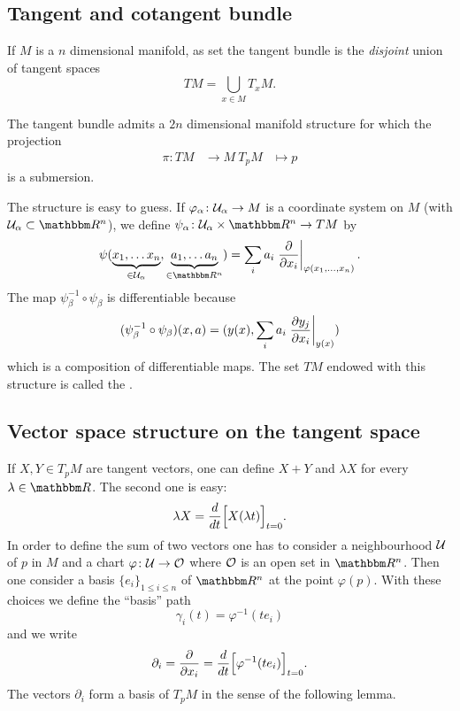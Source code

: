 \subsection{Tangent and cotangent bundle}

If $M$ is a $n$ dimensional manifold, as set the tangent bundle is the \emph{disjoint} union of tangent spaces
\[
  TM=\bigcup_{x\in M}T_xM.
\]

\begin{theorem}
	The tangent bundle admits a $2n$ dimensional manifold structure for which the projection 
	\begin{equation}
		\begin{aligned}
			\pi \colon TM &\to M\
			T_pM&\mapsto p
		\end{aligned}
	\end{equation}	
	is a submersion.
\end{theorem}

The structure is easy to guess. If $\varphi_{\alpha}\colon \mathcal{U}_{\alpha}\to M$ is a coordinate system on $M$ (with $\mU_{\alpha}\subset\eR^n$), we define $\dpt{\psi_{\alpha}}{\mU_{\alpha}\times \eR^n}{TM}$ by
\[
  \psi( \underbrace{x_1,\ldots x_n}_{\in\mU_{\alpha}},\underbrace{a_1,\ldots a_n}_{\in\eR^n}  )
          =\sum_i a_i\left.\dsd{}{x_i}\right|_{\varphi(x_1,\ldots,x_n)}.
\]
The map $\psi_{\beta}^{-1}\circ\psi_{\beta}$ is differentiable because
\[
(\psi_{\beta}^{-1}\circ\psi_{\beta})(x,a)=( y(x),\sum_i a_i\left.\frac{\partial y_j}{\partial x_i}\right|_{y(x)}  )
\]
which is a composition of differentiable maps. The set $TM$ endowed with this structure is called the .

\subsection{Vector space structure on the tangent space}

If \( X,Y\in T_pM\) are tangent vectors, one can define \( X+Y\) and \( \lambda X\) for every \( \lambda\in\eR\). The second one is easy:
\begin{equation}
    \lambda X=\frac{d}{dt}\Big[ X(\lambda t) \Big]_{t=0}.
\end{equation}
In order to define the sum of two vectors one has to consider a neighbourhood \( \mathcal{U}\) of \( p\) in \( M\) and a chart \( \varphi\colon \mathcal{U}\to \mathcal{O}\) where \( \mathcal{O}\) is an open set in \( \eR^n\). Then one consider a basis \( \{ e_i \}_{1\leq i\leq n}\) of \( \eR^n\) at the point \( \varphi(p)\). With these choices we define the ``basis'' path
\begin{equation}
    \gamma_i(t)=\varphi^{-1}(te_i)
\end{equation}
and we write
\begin{equation}
    \partial_i=\frac{ \partial  }{ \partial x_i }=\frac{d}{dt}\Big[ \varphi^{-1}(te_i) \Big]_{t=0}.
\end{equation}
The vectors \( \partial_i\) form a basis of \( T_pM\) in the sense of the following lemma.

